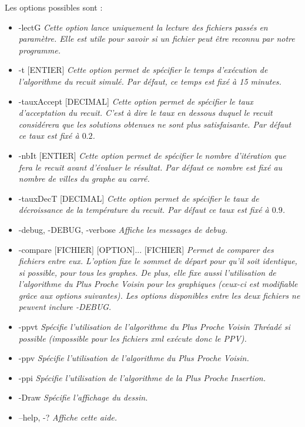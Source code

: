 \documentclass{article}
\begin{document}
Les options possibles sont :\smallskip
\begin{itemize}
\item -lectG \emph{Cette option lance uniquement la lecture des fichiers passés en paramètre. Elle est utile pour savoir si un fichier peut être reconnu par notre programme.}\smallskip

\item -t [ENTIER] \emph{Cette option permet de spécifier le temps d'exécution de l'algorithme du recuit simulé. Par défaut, ce temps est fixé à 15 minutes.}\smallskip

\item -tauxAccept [DECIMAL] \emph{Cette option permet de spécifier le taux d'acceptation du recuit. C'est à dire le taux en dessous duquel le recuit considérera que les solutions obtenues ne sont plus satisfaisante. Par défaut ce taux est fixé à $0.2$.}\smallskip

\item -nbIt [ENTIER] \emph{Cette option permet de spécifier le nombre d'itération que fera le recuit avant d'évaluer le résultat. Par défaut ce nombre est fixé au nombre de villes du graphe au carré.}\smallskip

\item -tauxDecT [DECIMAL] \emph{Cette option permet de spécifier le taux de décroissance de la température du recuit. Par défaut ce taux est fixé à $0.9$.}\smallskip

\item -debug, -DEBUG, -verbose \emph{Affiche les messages de debug.}\smallskip

\item -compare [FICHIER] [OPTION]... [FICHIER] \emph{
Permet de comparer des fichiers entre eux. L'option fixe le sommet de départ pour qu'il soit identique, si possible, pour tous les graphes.
De plus, elle fixe aussi l'utilisation de l'algorithme du Plus Proche Voisin pour les graphiques (ceux-ci est modifiable grâce aux options suivantes).
Les options disponibles entre les deux fichiers ne peuvent inclure -DEBUG.}\smallskip

\item -ppvt \emph{Spécifie l'utilisation de l'algorithme du Plus Proche Voisin Thréadé si possible (impossible pour les fichiers xml exécute donc le PPV).}\smallskip

\item -ppv \emph{Spécifie l'utilisation de l'algorithme du Plus Proche Voisin.}\smallskip

\item -ppi \emph{Spécifie l'utilisation de l'algorithme de la Plus Proche Insertion.}\smallskip

\item -Draw \emph{Spécifie l'affichage du dessin.}\smallskip

\item --help, -? \emph{Affiche cette aide.}
\end{itemize}															
							
\end{document}
